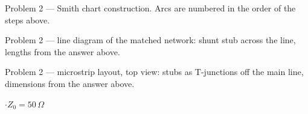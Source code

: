 {\footnotesize\color{sub} Problem 2 --- Smith chart construction. Arcs are numbered in the order of the steps above.}

{\footnotesize\color{sub} Problem 2 --- line diagram of the matched network: shunt stub across the line, lengths from the answer above.}

{\footnotesize\color{sub} Problem 2 --- microstrip layout, top view: stubs as T-junctions off the main line, dimensions from the answer above.}

\vspace{2pt}

{\color{sub}\footnotesize {} \gap$\cdot$\gap $Z_0 = 50\,\Omega$}

